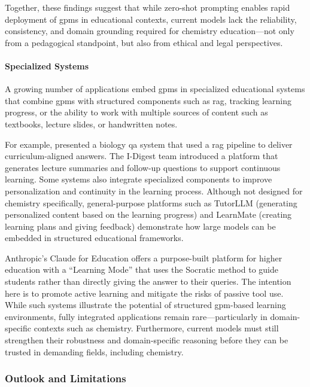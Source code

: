 Together, these findings suggest that while zero-shot prompting enables rapid deployment of \glspl{gpm} in educational contexts, current models lack the reliability, consistency, and domain grounding required for chemistry education---not only from a pedagogical standpoint, but also from ethical and legal perspectives.

\paragraph{Specialized Systems}
A growing number of applications embed \glspl{gpm} in specialized educational systems that combine \glspl{gpm} with structured components such as \gls{rag}, tracking learning progress, or the ability to work with multiple sources of content such as textbooks, lecture slides, or handwritten notes.

For example, \textcite{perez2025large} presented a biology \gls{qa} system that used a \gls{rag} pipeline to deliver curriculum-aligned answers. 
The I-Digest team \autocite{Jablonka2023} introduced a platform that generates lecture summaries and follow-up questions to support continuous learning. 
Some systems also integrate specialized components to improve personalization and continuity in the learning process. 
Although not designed for chemistry specifically, general-purpose platforms such as TutorLLM \autocite{li2025tutorllm0} (generating personalized content based on the learning progress) and LearnMate \autocite{wang2025learnmate0} (creating learning plans and giving feedback) demonstrate how large models can be embedded in structured educational frameworks. 

Anthropic's Claude for Education \autocite{AnthropicEducation} offers a purpose-built platform for higher education with a \enquote{Learning Mode} that uses the Socratic method to guide students rather than directly giving the answer to their queries. The intention here is to promote active learning and mitigate the risks of passive tool use. 
While such systems illustrate the potential of structured \gls{gpm}-based learning environments, fully integrated applications remain rare---particularly in domain-specific contexts such as chemistry. 
Furthermore, current models must still strengthen their robustness and domain-specific reasoning before they can be trusted in demanding fields, including chemistry.

\subsubsection{Outlook and Limitations}

